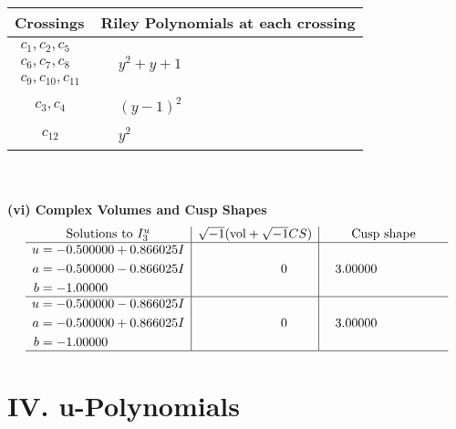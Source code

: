 \documentclass[1p]{elsarticle_modified}
\theoremstyle{definition}
\newcommand{\I}{\sqrt{-1}}
\begin{document}
\begin{tabular}{m{50pt}|m{274pt}}
Crossings & \hspace{64pt}Riley Polynomials at each crossing \\
\hline $$\begin{aligned}c_{1},c_{2},c_{5}\\c_{6},c_{7},c_{8}\\c_{9},c_{10},c_{11}\end{aligned}$$&$\begin{aligned}
&y^2+y+1
\end{aligned}$\\
\hline $$\begin{aligned}c_{3},c_{4}\end{aligned}$$&$\begin{aligned}
&(y-1)^2
\end{aligned}$\\
\hline $$\begin{aligned}c_{12}\end{aligned}$$&$\begin{aligned}
&y^2
\end{aligned}$\\
\hline
\end{tabular}\\~\\
\newpage\flushleft \textbf{(vi) Complex Volumes and Cusp Shapes}
$$\begin{array}{c|c|c}  
\text{Solutions to }I^u_{3}& \I (\text{vol} + \sqrt{-1}CS) & \text{Cusp shape}\\
 \hline 
\begin{aligned}
u &= -0.500000 + 0.866025 I \\
a &= -0.500000 - 0.866025 I \\
b &= -1.00000\phantom{ +0.000000I}\end{aligned}
 & \phantom{-0.000000 } 0 & \phantom{-}3.00000\phantom{ +0.000000I} \\ \hline\begin{aligned}
u &= -0.500000 - 0.866025 I \\
a &= -0.500000 + 0.866025 I \\
b &= -1.00000\phantom{ +0.000000I}\end{aligned}
 & \phantom{-0.000000 } 0 & \phantom{-}3.00000\phantom{ +0.000000I}\\
 \hline 
 \end{array}$$\newpage
\newpage\renewcommand{\arraystretch}{1}
\centering \section*{ IV. u-Polynomials}
\end{document}
